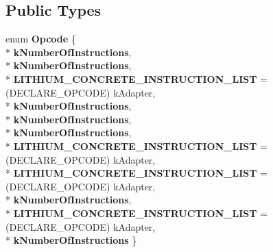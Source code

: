 \subsection*{Public Types}
\begin{DoxyCompactItemize}
\item 
enum {\bfseries Opcode} \{ \\*
{\bfseries k\+Number\+Of\+Instructions}, 
\\*
{\bfseries k\+Number\+Of\+Instructions}, 
\\*
{\bfseries L\+I\+T\+H\+I\+U\+M\+\_\+\+C\+O\+N\+C\+R\+E\+T\+E\+\_\+\+I\+N\+S\+T\+R\+U\+C\+T\+I\+O\+N\+\_\+\+L\+I\+ST} =(D\+E\+C\+L\+A\+R\+E\+\_\+\+O\+P\+C\+O\+DE) k\+Adapter, 
\\*
{\bfseries k\+Number\+Of\+Instructions}, 
\\*
{\bfseries k\+Number\+Of\+Instructions}, 
\\*
{\bfseries k\+Number\+Of\+Instructions}, 
\\*
{\bfseries L\+I\+T\+H\+I\+U\+M\+\_\+\+C\+O\+N\+C\+R\+E\+T\+E\+\_\+\+I\+N\+S\+T\+R\+U\+C\+T\+I\+O\+N\+\_\+\+L\+I\+ST} =(D\+E\+C\+L\+A\+R\+E\+\_\+\+O\+P\+C\+O\+DE) k\+Adapter, 
\\*
{\bfseries L\+I\+T\+H\+I\+U\+M\+\_\+\+C\+O\+N\+C\+R\+E\+T\+E\+\_\+\+I\+N\+S\+T\+R\+U\+C\+T\+I\+O\+N\+\_\+\+L\+I\+ST} =(D\+E\+C\+L\+A\+R\+E\+\_\+\+O\+P\+C\+O\+DE) k\+Adapter, 
\\*
{\bfseries k\+Number\+Of\+Instructions}, 
\\*
{\bfseries L\+I\+T\+H\+I\+U\+M\+\_\+\+C\+O\+N\+C\+R\+E\+T\+E\+\_\+\+I\+N\+S\+T\+R\+U\+C\+T\+I\+O\+N\+\_\+\+L\+I\+ST} =(D\+E\+C\+L\+A\+R\+E\+\_\+\+O\+P\+C\+O\+DE) k\+Adapter, 
\\*
{\bfseries k\+Number\+Of\+Instructions}
 \}\hypertarget{classv8_1_1internal_1_1_l_instruction_a5fface668216c981c65cddd0c9feb0de}{}\label{classv8_1_1internal_1_1_l_instruction_a5fface668216c981c65cddd0c9feb0de}


\end{DoxyCompactItemize}
